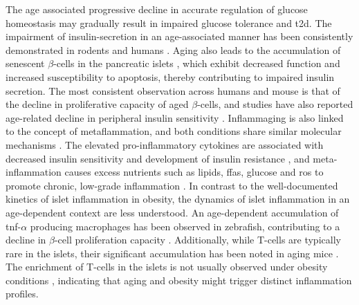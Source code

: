 \par The age associated progressive decline in accurate regulation of glucose homeostasis may gradually result in impaired glucose tolerance and \gls{t2d}. The impairment of insulin-secretion in an age-associated manner has been consistently demonstrated in rodents and humans \textbf{\cite{sandovici_ageing_2016,muzumdar_decrease_2004}}. Aging also leads to the accumulation of senescent $\beta$-cells in the pancreatic islets \textbf{\cite{tuduri_pancreatic_2022}}, which exhibit decreased function and increased susceptibility to apoptosis, thereby contributing to impaired insulin secretion. The most consistent observation across humans and mouse is that of the decline in proliferative capacity of aged $\beta$-cells, and studies have also reported age-related decline in peripheral insulin sensitivity \textbf{\cite{tuduri_pancreatic_2022}}. Inflammaging is also linked to the concept of metaflammation, and both conditions share similar molecular mechanisms \textbf{\cite{franceschi_inflammaging_2018,prattichizzo_inflammageing_2018}}. The elevated pro-inflammatory cytokines are associated with decreased insulin sensitivity and development of insulin resistance \textbf{\cite{rehman_mechanisms_2016}}, and meta-inflammation causes excess nutrients such as lipids, \glspl{ffa}, glucose and \gls{ros} to promote chronic, low-grade inflammation \textbf{\cite{frasca_aging_2017}}. In contrast to the well-documented kinetics of islet inflammation in obesity, the dynamics of islet inflammation in an age-dependent context are less understood. An age-dependent accumulation of \gls{tnf}-$\alpha$ producing macrophages has been observed in zebrafish, contributing to a decline in $\beta$-cell proliferation capacity \textbf{\cite{janjuha_age-related_2018}}. Additionally, while T-cells are typically rare in the islets, their significant accumulation has been noted in aging mice \textbf{\cite{denroche_t_2021}}. The enrichment of T-cells in the islets is not usually observed under obesity conditions \textbf{\cite{eguchi_islet_2017}}, indicating that aging and obesity might trigger distinct inflammation profiles.\\

